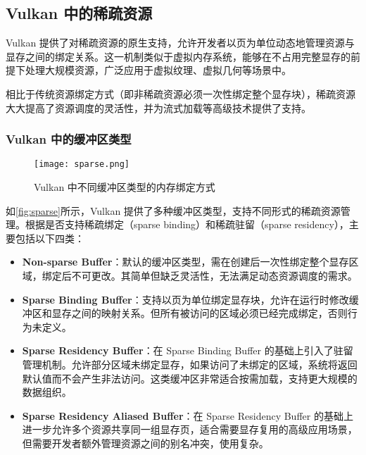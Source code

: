 \cleardoublepage

{

    \appendixsubsecmajornumbering

    \subsection{Vulkan 中的稀疏资源}
    \label{appendix:sparse}

    Vulkan 提供了对稀疏资源的原生支持，允许开发者以页为单位动态地管理资源与显存之间的绑定关系。这一机制类似于虚拟内存系统，能够在不占用完整显存的前提下处理大规模资源，广泛应用于虚拟纹理、虚拟几何等场景中。

    相比于传统资源绑定方式（即非稀疏资源必须一次性绑定整个显存块），稀疏资源大大提高了资源调度的灵活性，并为流式加载等高级技术提供了支持。

    \subsubsection{Vulkan 中的缓冲区类型}

    \begin{figure}[htbp]
        \centering
        \texttt{[image: sparse.png]}
        \caption{\label{fig:sparse}Vulkan 中不同缓冲区类型的内存绑定方式}
    \end{figure}
    
    如\autoref{fig:sparse}所示，Vulkan 提供了多种缓冲区类型，支持不同形式的稀疏资源管理。根据是否支持稀疏绑定（sparse binding）和稀疏驻留（sparse residency），主要包括以下四类：

    \begin{itemize}
        \item \textbf{Non-sparse Buffer}：默认的缓冲区类型，需在创建后一次性绑定整个显存区域，绑定后不可更改。其简单但缺乏灵活性，无法满足动态资源调度的需求。
        
        \item \textbf{Sparse Binding Buffer}：支持以页为单位绑定显存块，允许在运行时修改缓冲区和显存之间的映射关系。但所有被访问的区域必须已经完成绑定，否则行为未定义。
        
        \item \textbf{Sparse Residency Buffer}：在 Sparse Binding Buffer 的基础上引入了驻留管理机制。允许部分区域未绑定显存，如果访问了未绑定的区域，系统将返回默认值而不会产生非法访问。这类缓冲区非常适合按需加载，支持更大规模的数据组织。
        
        \item \textbf{Sparse Residency Aliased Buffer}：在 Sparse Residency Buffer 的基础上进一步允许多个资源共享同一组显存页，适合需要显存复用的高级应用场景，但需要开发者额外管理资源之间的别名冲突，使用复杂。
    \end{itemize}

}
